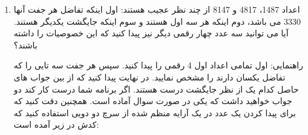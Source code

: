 \documentclass[oneside]{article}
\newcommand{\inputcode}[2]{\inputminted[mathescape,%
                                                 linenos=false,%
                                                 formatcom=\small\setstretch{1}]{#1}{#2}}%
\begin{document}
\begin{enumerate}
\item
اعداد 1487، 4817 و 8147 از چند نظر عجیب هستند: اول اینکه تفاضل هر جفت آنها 3330 می باشد، دوم اینکه هر سه اول هستند و سوم اینکه جایگشت یکدیگر هستند. آیا می توانید سه عدد چهار رقمی دیگر نیز پیدا کنید که این خصوصیات را داشته باشند؟

راهنمایی: اول تمامی اعداد اول 4 رقمی را پیدا کنید. سپس هر جفت سه تایی را که تفاضل یکسان دارند را مشخص نمایید. در نهایت پیدا کنید که از بین جواب های حاصل کدام یک از نظر جایگشت درست هستند. اگر برنامه شما درست کار کند دو جواب خواهید داشت که یکی در صورت سوال آماده است. همچنین دقت کنید که برای پیدا کردن یک عدد در یک آرایه منظم شده از سرچ دو دویی استفاده کنید که کدش در زیر آمده است:
\inputcode{c++}{bin_search.cpp}


\end{enumerate}
\end{document}
